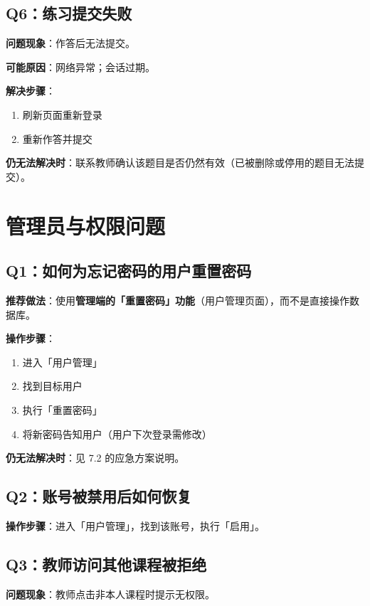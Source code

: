 \documentclass[UTF8,a4paper,11pt]{ctexrep}
\begin{document}
\subsection{Q6：练习提交失败}

\textbf{问题现象}：作答后无法提交。

\textbf{可能原因}：网络异常；会话过期。

\textbf{解决步骤}：

\begin{enumerate}
\item 刷新页面重新登录
\item 重新作答并提交
\end{enumerate}
\textbf{仍无法解决时}：联系教师确认该题目是否仍然有效（已被删除或停用的题目无法提交）。


\section{管理员与权限问题}


\subsection{Q1：如何为忘记密码的用户重置密码}

\textbf{推荐做法}：使用\textbf{管理端的「重置密码」功能}（用户管理页面），而不是直接操作数据库。

\textbf{操作步骤}：

\begin{enumerate}
\item 进入「用户管理」
\item 找到目标用户
\item 执行「重置密码」
\item 将新密码告知用户（用户下次登录需修改）
\end{enumerate}
\textbf{仍无法解决时}：见 7.2 的应急方案说明。


\subsection{Q2：账号被禁用后如何恢复}

\textbf{操作步骤}：进入「用户管理」，找到该账号，执行「启用」。


\subsection{Q3：教师访问其他课程被拒绝}

\textbf{问题现象}：教师点击非本人课程时提示无权限。
\end{document}
